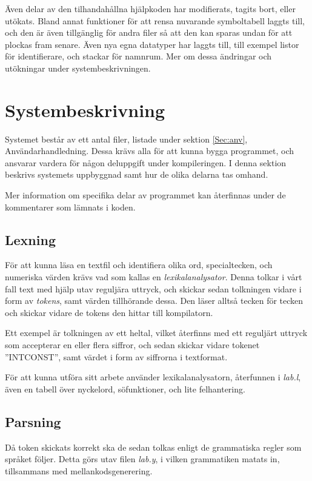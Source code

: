 		Även delar av den tilhandahållna hjälpkoden har modifierats, tagits bort, eller utökats. Bland annat funktioner för att rensa nuvarande symboltabell laggts till, och den är även tillgänglig för andra filer så att den kan sparas undan för att plockas fram senare. Även nya egna datatyper har laggts till, till exempel listor för identifierare, och stackar för namnrum. Mer om dessa ändringar och utökningar under systembeskrivningen.

\pagebreak

\section{Systembeskrivning}

	
	Systemet består av ett antal filer, listade under sektion \ref{Sec:anv}, Användarhandledning. Dessa krävs alla för att kunna bygga programmet, och ansvarar vardera för någon deluppgift under kompileringen. I denna sektion beskrivs systemets uppbyggnad samt hur de olika delarna tas omhand.
	
	Mer information om specifika delar av programmet kan återfinnas under de kommentarer som lämnats i koden.	
	
	\subsection{Lexning}
		För att kunna läsa en textfil och identifiera olika ord, specialtecken, och numeriska värden krävs vad som kallas en \textit{lexikalanalysator}. Denna tolkar i vårt fall text med hjälp utav reguljära uttryck, och skickar sedan tolkningen vidare i form av \textit{tokens}, samt värden tillhörande dessa. Den läser alltså tecken för tecken och skickar vidare de tokens den hittar till kompilatorn.
		
		Ett exempel är tolkningen av ett heltal, vilket återfinns med ett reguljärt uttryck som accepterar en eller flera siffror, och sedan skickar vidare tokenet ''INTCONST'', samt värdet i form av siffrorna i textformat.
		
		För att kunna utföra sitt arbete använder lexikalanalysatorn, återfunnen i \textit{lab.l}, även en tabell över nyckelord, söfunktioner, och lite felhantering.
	
	\subsection{Parsning}	
		Då token skickats korrekt ska de sedan tolkas enligt de grammatiska regler som språket följer. Detta görs utav filen \textit{lab.y}, i vilken grammatiken matats in, tillsammans med mellankodsgenerering.
		
